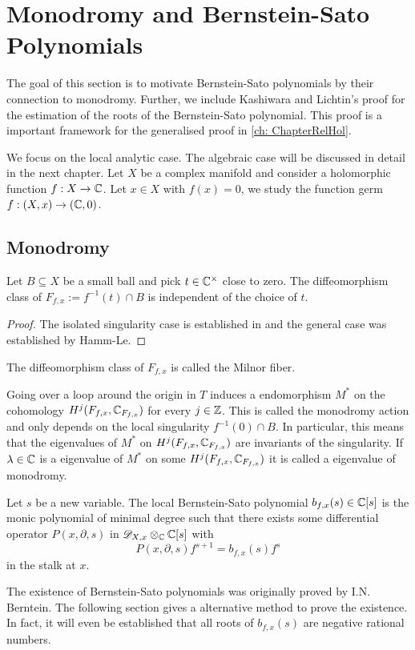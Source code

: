 \section{Monodromy and Bernstein-Sato Polynomials}\label{sec: MonodromyBS}
The goal of this section is to motivate Bernstein-Sato polynomials by their connection to monodromy.
Further, we include Kashiwara and Lichtin's proof for the estimation of the roots of the Bernstein-Sato polynomial.
This proof is a important framework for the generalised proof in \cref{ch: ChapterRelHol}.

We focus on the local analytic case.
The algebraic case will be discussed in detail in the next chapter.
Let $X$ be a complex manifold and consider a holomorphic function $f:X \to \mathbb{C}$.
Let $x\in X$ with $f(x) = 0$, we study the function germ $f:(X,x)\to (\mathbb{C},0)$.
\subsection{Monodromy}
\begin{theorem}
  Let $B\subseteq X$ be a small ball and pick $t\in \mathbb{C}^\times$ close to zero. The diffeomorphism class of $F_{f,x} := f^{-1}(t)\cap B $  is independent of the choice of $t$.
\end{theorem}
\begin{proof}
  The isolated singularity case is established in \cite{milnor1968singular} and the general case was established by Hamm-Le.
\end{proof}
\begin{definition}
  The diffeomorphism class of $F_{f,x}$ is called the Milnor fiber.
\end{definition}
Going over a loop around the origin in $T$ induces a endomorphism $M^*$ on the cohomology $H^j(F_{f,x},\mathbb{C}_{F_{f,x}})$ for every $j\in \mathbb{Z}$.
This is called the monodromy action and only depends on the local singularity $f^{-1}(0)\cap B$.
In particular, this means that the eigenvalues of $M^*$ on $H^j(F_{f,x},\mathbb{C}_{F_{f,x}})$ are invariants of the singularity.
If $\lambda \in \mathbb{C}$ is a eigenvalue of $M^*$ on some $H^j(F_{f,x},\mathbb{C}_{F_{f,x}})$ it is called a eigenvalue of monodromy.


\begin{definition}
  Let $s$ be a new variable.
  The local Bernstein-Sato polynomial $b_{f,x}(s)\in \mathbb{C}[s]$ is the monic polynomial of minimal degree such that there exists some differential operator $P(x,\partial,s)$ in $\mathscr{D}_{X,x}\otimes_{\mathbb{C}}\mathbb{C}[s]$ with
  $$P(x,\partial,s) f^{s+1} = b_{f,x}(s) f^s$$
  in the stalk at $x$.
\end{definition}
The existence of Bernstein-Sato polynomials was originally proved by I.N. Berntein.
The following section gives a alternative method to prove the existence.
In fact, it will even be established that all roots of $b_{f,x}(s)$ are negative rational numbers.

